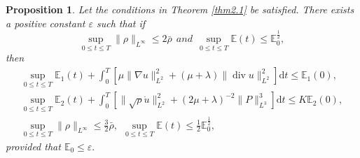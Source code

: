 \documentclass[11pt]{article}
\newtheorem{Proposition}{Proposition}[section]
\DeclareMathOperator{\divv}{div}
\begin{document}
\begin{Proposition}\label{pro4.1}
Let the conditions in Theorem \ref{thm2.1} be satisfied.
There exists a positive constant $\varepsilon$ such that if
\begin{equation}\label{4.1}
\sup_{0 \leq t \leq T}\|\rho \|_{L^\infty } \leq 2 \bar \rho \ \ and \ \ \sup_{0 \leq t \leq T} \mathbb{E} (t) \leq \mathbb{E}_0^{\frac{1}{2}},
\end{equation}
then
\begin{gather}\label{4.3}
\sup_{0 \leq t \leq T} \mathbb{E}_1 (t) + \int^T_0 \left[ \mu \|\nabla u\|_{L^2}^2 + (\mu + \lambda ) \|\divv u\|_{L^2}^2 \right] \mathrm{d} t \leq \mathbb{E}_1 (0),
\\ \label{4.4}
\sup_{0 \leq t \leq T} \mathbb{E}_2 (t) + \int^T_0 \left[\|\sqrt{\rho} \dot{u}\|_{L^2}^2 + (2 \mu + \lambda )^{-2} \|P\|_{L^3}^3 \right] \mathrm{d} t \leq K \mathbb{E}_2 (0),\\
\label{4.2}
\sup_{0 \leq t \leq T}\|\rho \|_{L^\infty } \leq \frac{3}{2} \bar \rho, \ \ \sup_{0 \leq t \leq T}\mathbb{E} (t) \leq \frac{1}{2} \mathbb{E}_0^{\frac{1}{2}},
\end{gather}
provided that $\mathbb{E}_0 \leq \varepsilon.$
\end{Proposition}
\end{document}
